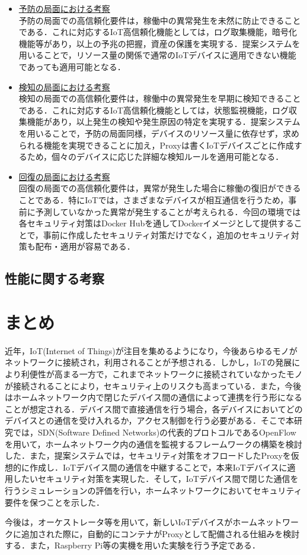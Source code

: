 \documentclass[Japanese]{dicomopapers}
\begin{document}
\begin{itemize}
	\item \underline{予防の局面における考察}\mbox{}\\
	      予防の局面での高信頼化要件は，稼働中の異常発生を未然に防止できることである．これに対応するIoT高信頼化機能としては，ログ取集機能，暗号化機能等があり，以上の予兆の把握，資産の保護を実現する．提案システムを用いることで，リソース量の関係で通常のIoTデバイスに適用できない機能であっても適用可能となる．
	\item \underline{検知の局面における考察}\mbox{}\\
	      検知の局面での高信頼化要件は，稼働中の異常発生を早期に検知できることである．これに対応するIoT高信頼化機能としては，状態監視機能，ログ収集機能があり，以上発生の検知や発生原因の特定を実現する．提案システムを用いることで，予防の局面同様，デバイスのリソース量に依存せず，求められる機能を実現できることに加え，Proxyは書くIoTデバイスごとに作成するため，個々のデバイスに応じた詳細な検知ルールを適用可能となる．
	\item \underline{回復の局面における考察}\mbox{}\\
	      回復の局面での高信頼化要件は，異常が発生した場合に稼働の復旧ができることである．特にIoTでは，さまざまなデバイスが相互通信を行うため，事前に予測していなかった異常が発生することが考えられる．今回の環境では各セキュリティ対策はDocker Hubを通してDockerイメージとして提供することで，事前に作成したセキュリティ対策だけでなく，追加のセキュリティ対策も配布・適用が容易である．
\end{itemize}

\subsection{性能に関する考察}

\section{まとめ}
近年，IoT(Internet of Things)が注目を集めるようになり，今後あらゆるモノがネットワークに接続され，利用されることが予想される．しかし，IoTの発展により利便性が高まる一方で，これまでネットワークに接続されていなかったモノが接続されることにより，セキュリティ上のリスクも高まっている．また，今後はホームネットワーク内で閉じたデバイス間の通信によって連携を行う形になることが想定される．デバイス間で直接通信を行う場合，各デバイスにおいてどのデバイスとの通信を受け入れるか，アクセス制御を行う必要がある．そこで本研究では，SDN(Software Defined Networks)の代表的プロトコルであるOpenFlowを用いて，ホームネットワーク内の通信を監視するフレームワークの構築を検討した．また，提案システムでは，セキュリティ対策をオフロードしたProxyを仮想的に作成し．IoTデバイス間の通信を中継することで，本来IoTデバイスに適用したいセキュリティ対策を実現した．そして，IoTデバイス間で閉じた通信を行うシミュレーションの評価を行い，ホームネットワークにおいてセキュリティ要件を保つことを示した．\par
今後は，オーケストレータ等を用いて，新しいIoTデバイスがホームネットワークに追加された際に，自動的にコンテナがProxyとして配備される仕組みを検討する．また，Raspberry Pi等の実機を用いた実験を行う予定である．
\end{document}
